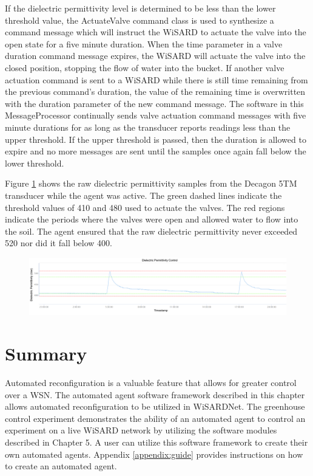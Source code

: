 If the dielectric permittivity level is determined to be less than the lower threshold value, the ActuateValve command class is used to synthesize a command message which will instruct the WiSARD to actuate the valve into the open state for a five minute duration. When the time parameter in a valve duration command message expires, the WiSARD will actuate the valve into the closed position, stopping the flow of water into the bucket. If another valve actuation command is sent to a WiSARD while there is still time remaining from the previous command's duration, the value of the remaining time is overwritten with the duration parameter of the new command message. The software in this MessageProcessor continually sends valve actuation command messages with five minute durations for as long as the transducer reports readings less than the upper threshold. If the upper threshold is passed, then the duration is allowed to expire and no more messages are sent until the samples once again fall below the lower threshold.

Figure \ref{fig:control} shows the raw dielectric permittivity samples from the Decagon 5TM transducer while the agent was active. The green dashed lines indicate the threshold values of 410 and 480 used to actuate the valves. The red regions indicate the periods where the valves were open and allowed water to flow into the soil. The agent ensured that the raw dielectric permittivity never exceeded 520 nor did it fall below 400. 

\begin{figure}
	\centering
	\includegraphics[width=\textwidth]{figures/moisture_control_portal_edit.png}
	\caption{}
	\label{fig:control}
\end{figure}

\section{Summary}
Automated reconfiguration is a valuable feature that allows for greater control over a WSN. The automated agent software framework described in this chapter allows automated reconfiguration to be utilized in WiSARDNet. The greenhouse control experiment demonstrates the ability of an automated agent to control an experiment on a live WiSARD network by utilizing the software modules described in Chapter 5. A user can utilize this software framework to create their own automated agents. Appendix \ref{appendix:guide} provides instructions on how to create an automated agent.


